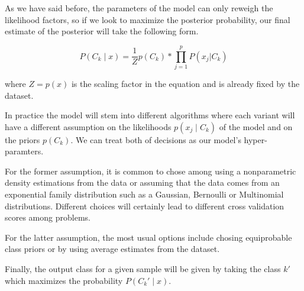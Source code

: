 As we have said before, the parameters of the model can only reweigh the likelihood factors, so if we look to maximize the posterior probability, our final estimate of the posterior will take the following form.

\[
P(C_k \mid x) = \frac{1}{Z} p(C_k) * \prod_{j=1}^{p}    P(x_j | C_k)
\]\label{equation-posteriorProbabilityDecomposition3}

where $Z = p(x)$ is the scaling factor in the equation and is already fixed by the dataset.

In practice the model will stem into different algorithms where each variant will have a different assumption on the likelihoods $p(x_j \mid C_k)$ of the model and on the priors $p(C_k)$. We can treat both of decisions as our model's hyper-paramters.

For the former assumption, it is common to chose among using a nonparametric density estimations from the data or assuming that the data comes from an exponential family distribution such as a Gaussian, Bernoulli or Multinomial distributions. Different choices will certainly lead to different cross validation scores among problems.

For the latter assumption, the most usual options include chosing equiprobable class priors or by using average estimates from the dataset.

Finally, the output class for a given sample will be given by taking the class $k'$ which maximizes the probability  $P(C_k' \mid x)$. 